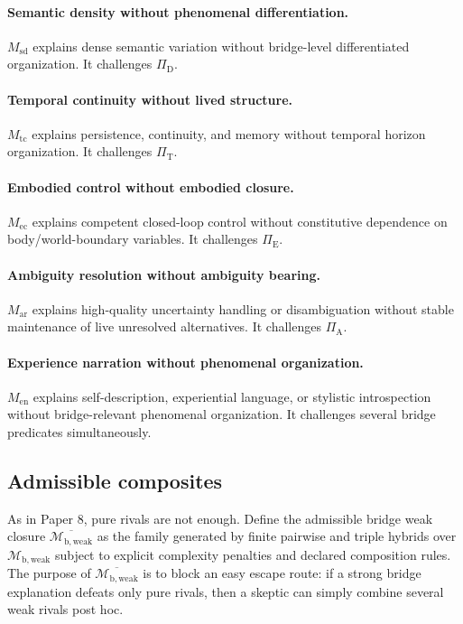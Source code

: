 \documentclass[11pt,a4paper]{article}
\theoremstyle{definition}
\newcommand{\PiD}{\Pi_{\mathrm{D}}}
\newcommand{\PiA}{\Pi_{\mathrm{A}}}
\newcommand{\PiE}{\Pi_{\mathrm{E}}}
\newcommand{\PiT}{\Pi_{\mathrm{T}}}
\newcommand{\BridgeWeakFam}{\mathcal{M}_{\mathrm{b,weak}}}
\newcommand{\BridgeWeakClosure}{\overline{\BridgeWeakFam}}
\begin{document}
\paragraph{Semantic density without phenomenal differentiation.}
$M_{\mathrm{sd}}$ explains dense semantic variation without bridge-level differentiated organization. It challenges $\PiD$.

\paragraph{Temporal continuity without lived structure.}
$M_{\mathrm{tc}}$ explains persistence, continuity, and memory without temporal horizon organization. It challenges $\PiT$.

\paragraph{Embodied control without embodied closure.}
$M_{\mathrm{ec}}$ explains competent closed-loop control without constitutive dependence on body/world-boundary variables. It challenges $\PiE$.

\paragraph{Ambiguity resolution without ambiguity bearing.}
$M_{\mathrm{ar}}$ explains high-quality uncertainty handling or disambiguation without stable maintenance of live unresolved alternatives. It challenges $\PiA$.

\paragraph{Experience narration without phenomenal organization.}
$M_{\mathrm{en}}$ explains self-description, experiential language, or stylistic introspection without bridge-relevant phenomenal organization. It challenges several bridge predicates simultaneously.

\subsection{Admissible composites}
As in Paper 8, pure rivals are not enough. Define the admissible bridge weak closure $\BridgeWeakClosure$ as the family generated by finite pairwise and triple hybrids over $\BridgeWeakFam$ subject to explicit complexity penalties and declared composition rules. The purpose of $\BridgeWeakClosure$ is to block an easy escape route: if a strong bridge explanation defeats only pure rivals, then a skeptic can simply combine several weak rivals post hoc.
\end{document}
